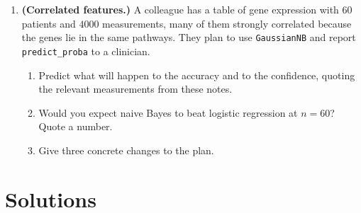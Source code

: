 \documentclass[11pt]{article}
\begin{document}
\begin{enumerate}[leftmargin=*, itemsep=0.55em]
\item \textbf{(Correlated features.)} A colleague has a table of gene
  expression with $60$ patients and $4000$ measurements, many of them
  strongly correlated because the genes lie in the same pathways. They plan
  to use \texttt{GaussianNB} and report \texttt{predict\_proba} to a
  clinician.
  \begin{enumerate}[label=(\alph*)]
    \item Predict what will happen to the accuracy and to the confidence,
      quoting the relevant measurements from these notes.
    \item Would you expect naive Bayes to beat logistic regression at
      $n = 60$? Quote a number.
    \item Give three concrete changes to the plan.
  \end{enumerate}

\end{enumerate}

\section{Solutions}
\label{sec:solutions}
\end{document}
